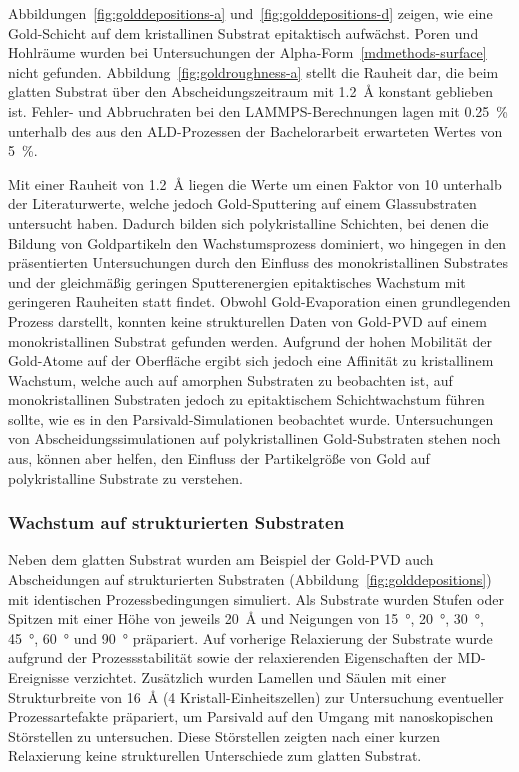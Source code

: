Abbildungen~\ref{fig:golddepositions-a} und~\ref{fig:golddepositions-d} zeigen, wie eine Gold-Schicht auf dem kristallinen Substrat epitaktisch aufwächst.
Poren und Hohlräume wurden bei Untersuchungen der Alpha-Form~\ref{mdmethods-surface} nicht gefunden.
Abbildung~\ref{fig:goldroughness-a} stellt die Rauheit dar, die beim glatten Substrat über den Abscheidungszeitraum mit \SI{1.2}{\angstrom} konstant geblieben ist.
Fehler- und Abbruchraten bei den LAMMPS-Berechnungen lagen mit \SI{0.25}{\percent} unterhalb des aus den ALD-Prozessen der Bachelorarbeit erwarteten Wertes von \SI{5}{\percent}.

Mit einer Rauheit von \SI{1.2}{\angstrom} liegen die Werte um einen Faktor von \num{10} unterhalb der Literaturwerte\cite{svorcik_annealing_2011}, welche jedoch Gold-Sputtering auf einem Glassubstraten untersucht haben.
Dadurch bilden sich polykristalline Schichten, bei denen die Bildung von Goldpartikeln den Wachstumsprozess dominiert, wo hingegen in den präsentierten Untersuchungen durch den Einfluss des monokristallinen Substrates und der gleichmäßig geringen Sputterenergien epitaktisches Wachstum mit geringeren Rauheiten statt findet.
Obwohl Gold-Evaporation einen grundlegenden Prozess darstellt, konnten keine strukturellen Daten von Gold-PVD auf einem monokristallinen Substrat gefunden werden.
Aufgrund der hohen Mobilität der Gold-Atome auf der Oberfläche ergibt sich jedoch eine Affinität zu kristallinem Wachstum\cite{svorcik_annealing_2011,everitt_evolution_2000}, welche auch auf amorphen Substraten zu beobachten ist, auf monokristallinen Substraten jedoch zu epitaktischem Schichtwachstum führen sollte, wie es in den Parsivald-Simulationen beobachtet wurde.
Untersuchungen von Abscheidungssimulationen auf polykristallinen Gold-Substraten stehen noch aus, können aber helfen, den Einfluss der Partikelgröße von Gold auf polykristalline Substrate zu verstehen.

\subsubsection{Wachstum auf strukturierten Substraten}

Neben dem glatten Substrat wurden am Beispiel der Gold-PVD auch Abscheidungen auf strukturierten Substraten (Abbildung~\ref{fig:golddepositions}) mit identischen Prozessbedingungen simuliert.
Als Substrate wurden Stufen oder Spitzen mit einer Höhe von jeweils \SI{20}{\angstrom} und Neigungen von \SI{15}{\degree}, \SI{20}{\degree}, \SI{30}{\degree}, \SI{45}{\degree}, \SI{60}{\degree} und \SI{90}{\degree} präpariert.
Auf vorherige Relaxierung der Substrate wurde aufgrund der Prozessstabilität sowie der relaxierenden Eigenschaften der MD-Ereignisse verzichtet.
Zusätzlich wurden Lamellen und Säulen mit einer Strukturbreite von \SI{16}{\angstrom} (4 Kristall-Einheitszellen) zur Untersuchung eventueller Prozessartefakte präpariert, um Parsivald auf den Umgang mit nanoskopischen Störstellen zu untersuchen.
Diese Störstellen zeigten nach einer kurzen Relaxierung keine strukturellen Unterschiede zum glatten Substrat.

